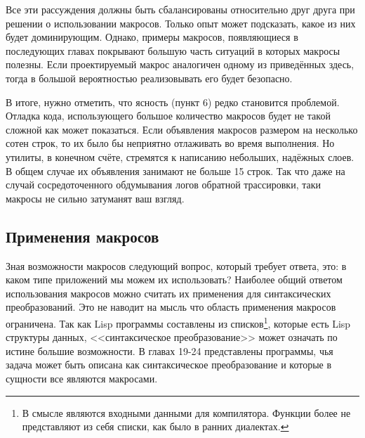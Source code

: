\documentclass[12pt, a4paper]{article} %
\begin{document}
Все эти рассуждения должны быть сбалансированы относительно друг друга при решении о использовании макросов. Только опыт может подсказать, какое из них будет доминирующим. Однако, примеры макросов, появляющиеся в последующих главах покрывают большую часть ситуаций в которых макросы полезны. Если проектируемый макрос аналогичен одному из приведённых здесь, тогда в большой вероятностью реализовывать его будет безопасно.

В итоге, нужно отметить, что ясность (пункт 6) редко становится проблемой. Отладка кода, использующего большое количество макросов будет не такой сложной как может показаться. Если объявления макросов размером на несколько сотен строк, то их было бы неприятно отлаживать во время выполнения. Но утилиты, в конечном счёте, стремятся к написанию небольших, надёжных слоев. В общем случае их объявления занимают не больше 15 строк. Так что даже на случай сосредоточенного обдумывания логов обратной трассировки, таки макросы не сильно затуманят ваш взгляд.


\subsection{Применения макросов}

Зная возможности макросов следующий вопрос, который требует ответа, это: в каком типе приложений мы можем их использовать? Наиболее общий ответом использования макросов можно считать их применения для синтаксических преобразований. Это не наводит на мысль что область применения макросов ограничена. Так как Lisp программы составлены из списков\footnote{В смысле являются входными данными для компилятора. Функции более не представляют из себя списки, как было в ранних диалектах. }, которые есть Lisp структуры данных, <<синтаксическое преобразование>> может означать по истине большие возможности. В главах 19-24 представлены программы, чья задача может быть описана как синтаксическое преобразование и которые в сущности все являются макросами.
\end{document}
